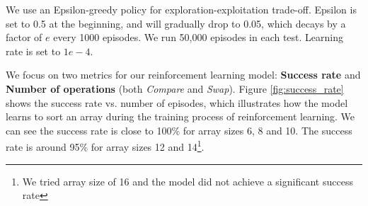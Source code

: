 \documentclass[pdflatex,sn-mathphys-num]{sn-jnl}%
\theoremstyle{thmstyleone}%
\theoremstyle{thmstyletwo}%
\theoremstyle{thmstylethree}%
\begin{document}
We use an Epsilon-greedy policy for exploration-exploitation trade-off. Epsilon is set to 0.5 at the beginning, and will gradually drop to 0.05, which decays by a factor of $e$ every 1000 episodes. We run 50,000 episodes in each test. Learning rate is set to $1e-4$.

We focus on two metrics for our reinforcement learning model: \textbf{Success rate} and \textbf{Number of operations} (both \emph{Compare} and \emph{Swap}). Figure \ref{fig:success_rate} shows the success rate vs. number of episodes, which illustrates how the model learns to sort an array during the training process of reinforcement learning. We can see the success rate is close to 100\% for array sizes 6, 8 and 10. The success rate is around 95\% for array sizes 12 and 14\footnote{We tried array size of 16 and the model did not achieve a significant success rate}.
\end{document}
